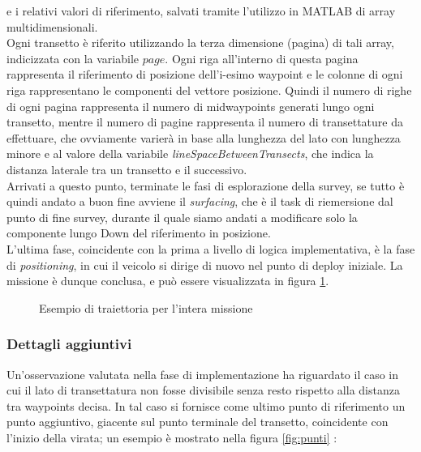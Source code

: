 \documentclass{article}
\begin{document}
                e i relativi valori di riferimento, salvati tramite l'utilizzo in MATLAB di array multidimensionali. \\
                Ogni transetto è riferito utilizzando la terza dimensione (pagina) di tali array, indicizzata con la variabile $page$.
                Ogni riga all'interno di questa pagina rappresenta il riferimento di posizione dell'i-esimo waypoint e le colonne di ogni riga rappresentano le componenti 
                del vettore posizione. Quindi il numero di righe di ogni pagina rappresenta il numero di midwaypoints generati lungo ogni 
                transetto, mentre il numero di pagine rappresenta il numero di transettature da effettuare, che ovviamente varierà in base alla lunghezza del lato 
                con lunghezza 
                minore e al valore della variabile \emph{lineSpaceBetweenTransects}, che indica la distanza laterale tra un transetto e 
                il successivo.\\
                
                Arrivati a questo punto, terminate le fasi di esplorazione della survey, se tutto è quindi andato a buon fine avviene il \emph{surfacing}, che è il 
                task di riemersione dal punto di fine survey, durante il quale siamo andati a modificare solo la componente lungo Down del riferimento in posizione.\\
                L'ultima fase, coincidente con la prima a livello di logica implementativa, è la fase di \emph{positioning}, in cui il veicolo si dirige di nuovo 
                nel punto di deploy iniziale. La missione è dunque conclusa, e può essere visualizzata in figura \ref{fig:mission}.

                \begin{figure} [ht]
                    \caption{Esempio di traiettoria per l'intera missione}
                    \label{fig:mission}
                \end{figure}

            \newpage
            \subsubsection{Dettagli aggiuntivi}
                Un'osservazione valutata nella fase di implementazione ha riguardato il caso in cui il lato di transettatura non fosse divisibile 
                senza resto rispetto alla distanza tra waypoints decisa. In tal caso si fornisce come ultimo punto di riferimento un punto aggiuntivo,
                giacente sul punto terminale del transetto, coincidente con l'inizio della virata;
                un esempio è mostrato nella figura \ref{fig:punti} :\\
\end{document}
